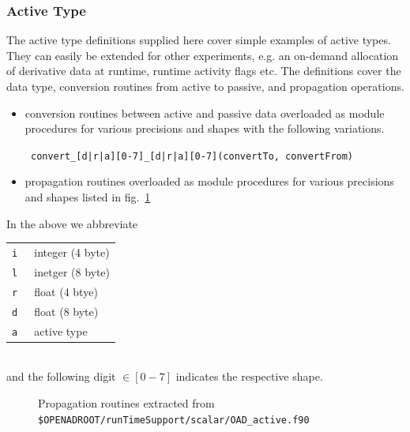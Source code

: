 \documentclass{book}
\newcommand{\reffig}[1]{{fig.~\ref{#1}}}
\begin{document}
\subsubsection{Active Type}\label{sec:activeTypeDefs}
The active type definitions supplied here cover simple examples of active types. 
They can easily be extended for other experiments, e.g. an on-demand  allocation of 
derivative data at runtime, runtime activity flags etc. 
The definitions cover the data type, conversion routines from active to passive, 
and propagation operations.
\begin{itemize}
\item conversion routines between active and passive data overloaded as module procedures for various  precisions and shapes with the following variations.
\begin{center}
\tt 
convert\_[d|r|a][0-7]\_[d|r|a][0-7](convertTo, convertFrom)
\end{center}
\item propagation routines overloaded as module procedures for various precisions and shapes listed in \reffig{fig:runtimeActive}
\end{itemize}
In the above we abbreviate \\[1ex]
\hspace*{.3cm}
\begin{tabular}{c|l}
\tt i & integer (4 byte) \\ 
\tt l & inetger (8 byte) \\ 
\tt r & float (4 btye) \\ 
\tt d & float (8 byte) \\ 
\tt a & active type \\
\end{tabular}\\
and the following digit $\in [0-7]$ indicates the respective shape.
\begin{figure}
\begin{minipage}[t]{.31\linewidth}
\scriptsize
\end{minipage}
\hspace{.02\linewidth}
\begin{minipage}[t]{.31\linewidth}
\scriptsize
\end{minipage}
\hspace{.02\linewidth}
\begin{minipage}[t]{.31\linewidth}
\scriptsize
\end{minipage}
\caption{Propagation routines extracted from \lstinline{$OPENADROOT/runTimeSupport/scalar/OAD_active.f90} %
}\label{fig:runtimeActive}	
\end{figure}
\end{document}
